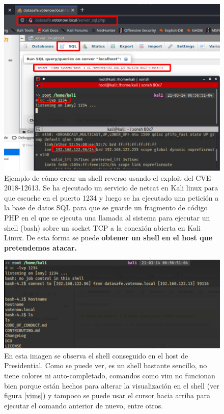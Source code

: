 \begin{figure}[!hbt]
  \centering
  \includegraphics[width=\textwidth]{imagenes/revershell.png}
  \caption{Ejemplo de cómo crear un shell reverso usando el exploit del CVE 2018-12613. Se ha ejecutado un servicio de netcat en Kali linux para que escuche en el puerto 1234 y luego se ha ejecutado una petición a la base de datos SQL para que se guarde un fragmento de código PHP en el que se ejecuta una llamada al sistema para ejecutar un shell (bash) sobre un socket TCP a la conexión abierta en Kali Linux. De esta forma se puede \textbf{obtener un shell en el host que pretendemos atacar.}}
   \label{reverse}
\end{figure}

\begin{figure}[!hbt]
  \centering
  \includegraphics[width=\textwidth]{imagenes/gotshell.png}
  \caption{En esta imagen se observa el shell conseguido en el host de Presidential. Como se puede ver, es un shell bastante sencillo, no tiene colores ni auto-completado, comandos como vim no funcionan bien porque están hechos para alterar la visualización en el shell (ver figura \ref{vims}) y tampoco se puede usar el cursor hacia arriba para ejecutar el comando anterior de nuevo, entre otros.}
   \label{reverse}
\end{figure}

